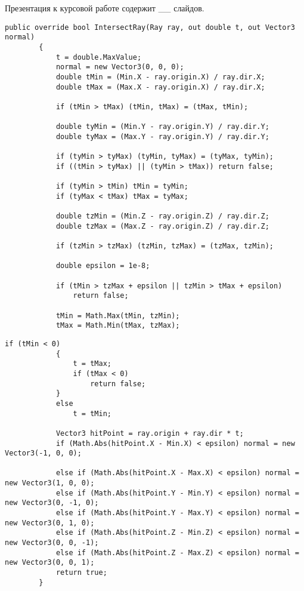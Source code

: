 Презентация к курсовой работе содержит \_\_ слайдов.

\clearpage

\begin{center}
	\begin{lstlisting}[label={lst:CubeIntersection}, captionpos={b}, caption={Алгоритм поиска точки пересечения луча с кубом (начало)}]
		public override bool IntersectRay(Ray ray, out double t, out Vector3 normal)
		{
			t = double.MaxValue;
			normal = new Vector3(0, 0, 0);
			double tMin = (Min.X - ray.origin.X) / ray.dir.X;
			double tMax = (Max.X - ray.origin.X) / ray.dir.X;
			
			if (tMin > tMax) (tMin, tMax) = (tMax, tMin);
			
			double tyMin = (Min.Y - ray.origin.Y) / ray.dir.Y;
			double tyMax = (Max.Y - ray.origin.Y) / ray.dir.Y;
			
			if (tyMin > tyMax) (tyMin, tyMax) = (tyMax, tyMin);
			if ((tMin > tyMax) || (tyMin > tMax)) return false;
			
			if (tyMin > tMin) tMin = tyMin;
			if (tyMax < tMax) tMax = tyMax;
			
			double tzMin = (Min.Z - ray.origin.Z) / ray.dir.Z;
			double tzMax = (Max.Z - ray.origin.Z) / ray.dir.Z;
			
			if (tzMin > tzMax) (tzMin, tzMax) = (tzMax, tzMin);
			
			double epsilon = 1e-8;
			
			if (tMin > tzMax + epsilon || tzMin > tMax + epsilon)
				return false;
			
			tMin = Math.Max(tMin, tzMin);
			tMax = Math.Min(tMax, tzMax);
		\end{lstlisting}
\end{center}	

\setcounter{lstlisting}{0}
\clearpage
\begin{center}
	\begin{lstlisting}[label={lst:CubeIntersection}, captionpos={b}, caption={Алгоритм поиска точки пересечения луча с кубом (конец)}]
			if (tMin < 0)
			{
				t = tMax;
				if (tMax < 0) 
					return false;
			}
			else 
				t = tMin;
		
			Vector3 hitPoint = ray.origin + ray.dir * t;
			if (Math.Abs(hitPoint.X - Min.X) < epsilon) normal = new Vector3(-1, 0, 0);
			
			else if (Math.Abs(hitPoint.X - Max.X) < epsilon) normal = new Vector3(1, 0, 0);
			else if (Math.Abs(hitPoint.Y - Min.Y) < epsilon) normal = new Vector3(0, -1, 0);
			else if (Math.Abs(hitPoint.Y - Max.Y) < epsilon) normal = new Vector3(0, 1, 0);
			else if (Math.Abs(hitPoint.Z - Min.Z) < epsilon) normal = new Vector3(0, 0, -1);
			else if (Math.Abs(hitPoint.Z - Max.Z) < epsilon) normal = new Vector3(0, 0, 1);
			return true;
		}
	\end{lstlisting}
\end{center}